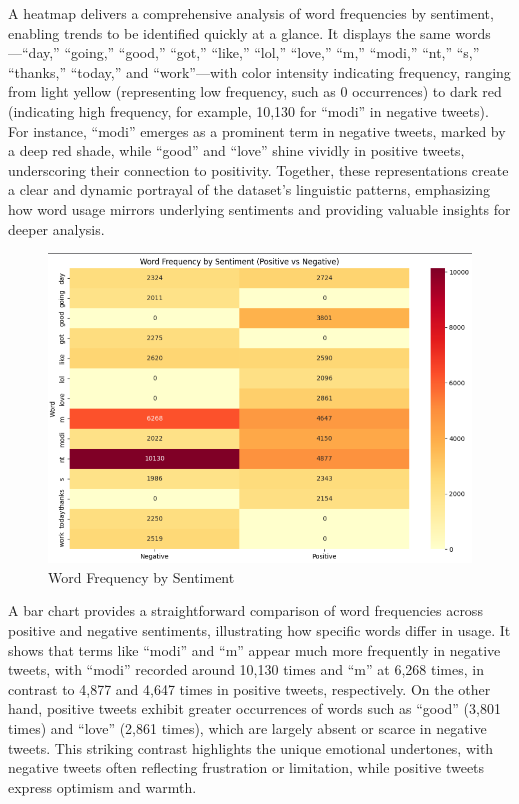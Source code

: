 A heatmap delivers a comprehensive analysis of word frequencies by sentiment, enabling trends to be identified quickly at a glance. It displays the same words—“day,” “going,” “good,” “got,” “like,” “lol,” “love,” “m,” “modi,” “nt,” “s,” “thanks,” “today,” and “work”—with color intensity indicating frequency, ranging from light yellow (representing low frequency, such as 0 occurrences) to dark red (indicating high frequency, for example, 10,130 for “modi” in negative tweets). For instance, “modi” emerges as a prominent term in negative tweets, marked by a deep red shade, while “good” and “love” shine vividly in positive tweets, underscoring their connection to positivity. Together, these representations create a clear and dynamic portrayal of the dataset’s linguistic patterns, emphasizing how word usage mirrors underlying sentiments and providing valuable insights for deeper analysis.

\begin{figure}[H]
    \centering
    \includegraphics[width=\textwidth]{img/visualize_pic/word_frequency.png}
    \caption{Word Frequency by Sentiment}
\end{figure}

A bar chart provides a straightforward comparison of word frequencies across positive and negative sentiments, illustrating how specific words differ in usage. It shows that terms like “modi” and “m” appear much more frequently in negative tweets, with “modi” recorded around 10,130 times and “m” at 6,268 times, in contrast to 4,877 and 4,647 times in positive tweets, respectively. On the other hand, positive tweets exhibit greater occurrences of words such as “good” (3,801 times) and “love” (2,861 times), which are largely absent or scarce in negative tweets. This striking contrast highlights the unique emotional undertones, with negative tweets often reflecting frustration or limitation, while positive tweets express optimism and warmth.

